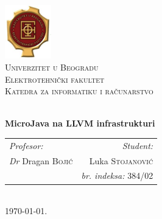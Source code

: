 \begin{titlepage}

\begin{center}


\includegraphics[width=0.15\textwidth]{etf_logo.jpg}\\[1cm]    

\textsc{\Large Univerzitet u Beogradu}\\[0.3cm]

\textsc{\LARGE Elektrotehnički fakultet}\\[0.3cm]

\textsc{\Large Katedra za informatiku i računarstvo}\\[1.5cm]


\HRule \\[0.6cm]

\begin{doublespace}
{\huge \bfseries MicroJava na LLVM infrastrukturi}\\[0.3cm]
\end{doublespace}
\HRule

\vfill

\setlength{\tabcolsep}{1cm}
\resizebox{0.98\textwidth}{!} {
\begin{tabular}{lr}
        \emph{Profesor:} 		& \emph{Student:} \\
        \emph{Dr} Dragan \textsc{Bojić} & Luka \textsc{Stojanović} \\
        \emph{ } 			& \emph{br. indeksa:} 384/02
\end{tabular}
}
\\[1cm]

{\large \today}.

\end{center}

\end{titlepage} 
